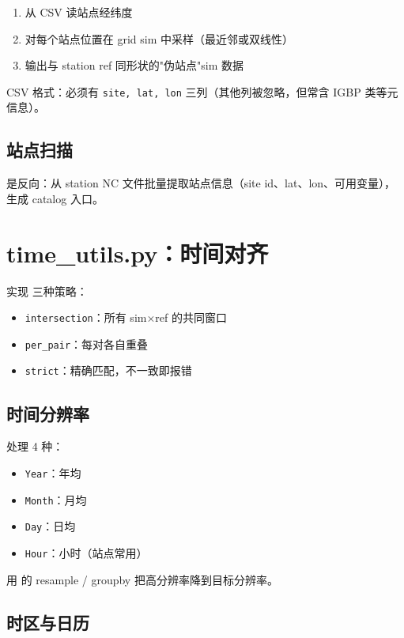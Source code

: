 \begin{enumerate}
  \item 从  CSV 读站点经纬度
  \item 对每个站点位置在 grid sim 中采样（最近邻或双线性）
  \item 输出与 station ref 同形状的"伪站点"sim 数据
\end{enumerate}

CSV 格式：必须有 \texttt{site, lat, lon} 三列（其他列被忽略，但常含 IGBP 类等元信息）。

\subsection{站点扫描}

 是反向：从 station NC 文件批量提取站点信息（site id、lat、lon、可用变量），生成 catalog 入口。

\section{time\_utils.py：时间对齐}

实现  三种策略：

\begin{itemize}
  \item \texttt{intersection}：所有 sim×ref 的共同窗口
  \item \texttt{per\_pair}：每对各自重叠
  \item \texttt{strict}：精确匹配，不一致即报错
\end{itemize}

\subsection{时间分辨率}

\openbench{} 处理 4 种：

\begin{itemize}
  \item \texttt{Year}：年均
  \item \texttt{Month}：月均
  \item \texttt{Day}：日均
  \item \texttt{Hour}：小时（站点常用）
\end{itemize}

 用  的 resample / groupby 把高分辨率降到目标分辨率。

\subsection{时区与日历}

